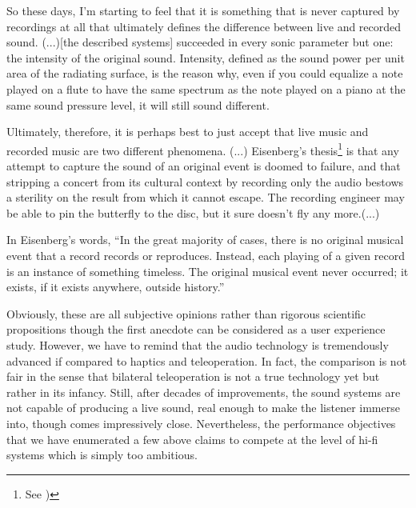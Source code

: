 \begin{displayquote}
So these days, I'm starting to feel that it is something that is never captured by recordings at all that ultimately defines the 
difference between live and recorded sound. (...)[the described systems] succeeded in 
every sonic parameter but one: the intensity of the original sound. Intensity, defined as the sound power per unit area of the 
radiating surface, is the reason why, even if you could equalize a note played on a flute to have the same spectrum as the note 
played on a piano at the same sound pressure level, it will still sound different.

Ultimately, therefore, it is perhaps best to just accept that live music and recorded music are two different phenomena. (...)
Eisenberg's thesis\footnote{See \cite{eisenberg})} is that any attempt to capture the sound of an original event is doomed to 
failure, and that stripping a concert from its cultural context by recording only the audio bestows a sterility on the result 
from which it cannot escape. The recording engineer may be able to pin the butterfly to the disc, but it sure doesn't fly any 
more.(...)

In Eisenberg's words, \enquote{In the great majority of cases, there is no original musical event that a record records or reproduces. 
Instead, each playing of a given record is an instance of something timeless. The original musical event never occurred; it exists, if 
it exists anywhere, outside history.}
\end{displayquote} 



Obviously, these are all subjective opinions rather than rigorous scientific propositions though the first anecdote can be considered as
a user experience study. However, we have to remind that the audio technology is tremendously advanced if compared to haptics and 
teleoperation. In fact, the comparison is not fair in the sense that bilateral teleoperation is not a true technology yet but rather 
in its infancy. Still, after decades of improvements, the sound systems are not capable of producing a live sound, real enough to make 
the listener immerse into, though comes impressively close. Nevertheless, the performance objectives that we have enumerated a few above 
claims to compete at the level of hi-fi systems which is simply too ambitious.

